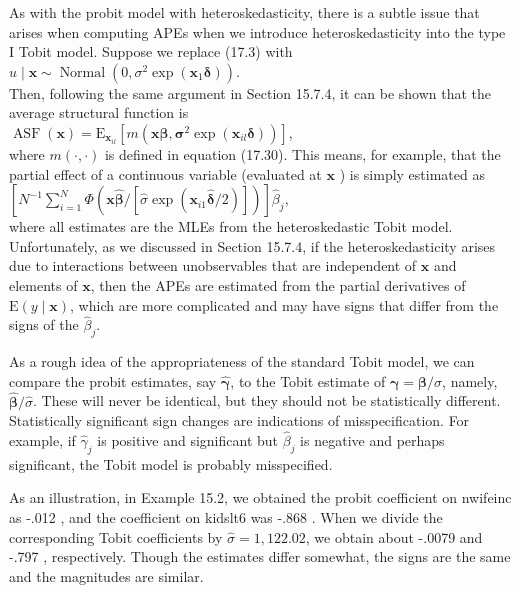 \documentclass[10pt]{article}
\begin{document}
As with the probit model with heteroskedasticity, there is a subtle issue that arises when computing APEs when we introduce heteroskedasticity into the type I Tobit model. Suppose we replace (17.3) with\\
$u \mid \mathbf{x} \sim \operatorname{Normal}\left(0, \sigma^{2} \exp \left(\mathbf{x}_{1} \boldsymbol{\delta}\right)\right)$.\\
Then, following the same argument in Section 15.7.4, it can be shown that the average structural function is\\
$\operatorname{ASF}(\mathbf{x})=\mathrm{E}_{\mathbf{x}_{i l}}\left[m\left(\mathbf{x} \boldsymbol{\beta}, \boldsymbol{\sigma}^{2} \exp \left(\mathbf{x}_{i l} \boldsymbol{\delta}\right)\right)\right]$,\\
where $m(\cdot, \cdot)$ is defined in equation (17.30). This means, for example, that the partial effect of a continuous variable (evaluated at $\mathbf{x}$ ) is simply estimated as\\
$\left[N^{-1} \sum_{i=1}^{N} \Phi\left(\mathbf{x} \hat{\boldsymbol{\beta}} /\left[\hat{\sigma} \exp \left(\mathbf{x}_{i 1} \hat{\boldsymbol{\delta}} / 2\right)\right]\right)\right] \hat{\beta}_{j}$,\\
where all estimates are the MLEs from the heteroskedastic Tobit model. Unfortunately, as we discussed in Section 15.7.4, if the heteroskedasticity arises due to interactions between unobservables that are independent of $\mathbf{x}$ and elements of $\mathbf{x}$, then the APEs are estimated from the partial derivatives of $\mathrm{E}(y \mid \mathbf{x})$, which are more complicated and may have signs that differ from the signs of the $\hat{\beta}_{j}$.

As a rough idea of the appropriateness of the standard Tobit model, we can compare the probit estimates, say $\hat{\boldsymbol{\gamma}}$, to the Tobit estimate of $\boldsymbol{\gamma}=\boldsymbol{\beta} / \sigma$, namely, $\hat{\boldsymbol{\beta}} / \hat{\sigma}$. These will never be identical, but they should not be statistically different. Statistically significant sign changes are indications of misspecification. For example, if $\hat{\gamma}_{j}$ is positive and significant but $\hat{\beta}_{j}$ is negative and perhaps significant, the Tobit model is probably misspecified.

As an illustration, in Example 15.2, we obtained the probit coefficient on nwifeinc as -.012 , and the coefficient on kidslt6 was -.868 . When we divide the corresponding Tobit coefficients by $\hat{\sigma}=1,122.02$, we obtain about -.0079 and -.797 , respectively. Though the estimates differ somewhat, the signs are the same and the magnitudes are similar.
\end{document}
